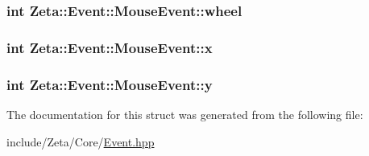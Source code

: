 \hypertarget{structZeta_1_1Event_1_1MouseEvent_a5bb942a148c877e42736eb54f4f338c8}{
\subsubsection[{wheel}]{\setlength{\rightskip}{0pt plus 5cm}int Zeta\+::\+Event\+::\+Mouse\+Event\+::wheel}}\label{structZeta_1_1Event_1_1MouseEvent_a5bb942a148c877e42736eb54f4f338c8}
\hypertarget{structZeta_1_1Event_1_1MouseEvent_a2a2d85d1de763cb6aae7663e4612bd25}{
\subsubsection[{x}]{\setlength{\rightskip}{0pt plus 5cm}int Zeta\+::\+Event\+::\+Mouse\+Event\+::x}}\label{structZeta_1_1Event_1_1MouseEvent_a2a2d85d1de763cb6aae7663e4612bd25}
\hypertarget{structZeta_1_1Event_1_1MouseEvent_ac156879c22a05daa1bdb1a60f8ca5f63}{
\subsubsection[{y}]{\setlength{\rightskip}{0pt plus 5cm}int Zeta\+::\+Event\+::\+Mouse\+Event\+::y}}\label{structZeta_1_1Event_1_1MouseEvent_ac156879c22a05daa1bdb1a60f8ca5f63}


The documentation for this struct was generated from the following file\+:\begin{DoxyCompactItemize}
\item 
include/\+Zeta/\+Core/\hyperlink{Event_8hpp}{Event.\+hpp}\end{DoxyCompactItemize}
